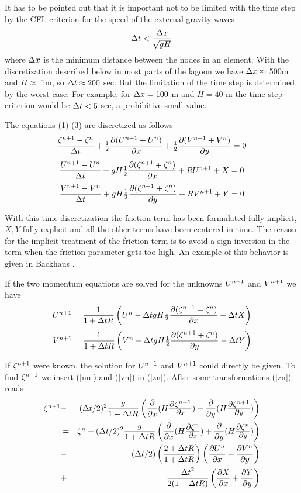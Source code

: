It has to be pointed out that it is important not to be limited with the time
step by the CFL criterion for the speed of the external gravity waves
\[
        \mbox{$\Delta t$} < \frac{\mbox{$\Delta x$}}{\sqrt{gH}}
\]
where $\mbox{$\Delta x$}$ is the minimum distance between the nodes in an element.
With the discretization described below in most parts of the lagoon
we have $\mbox{$\Delta x$} \approx$ 500m and $H \approx$ 1m, so $\mbox{$\Delta t$} \approx 200$ sec.
But the limitation of the time step is determined by the worst case.
For example, for $\mbox{$\Delta x$} = 100$ m and $H = 40$ m
the time step criterion would be $\mbox{$\Delta t$} < 5$ sec, a
prohibitive small value.

The equations (1)-(3) are discretized as follows
\begin{equation}
\label{zn}
\frac{\zn-\zo}{\dt}
                        + \mez \frac{\dpp (\un + \uo)}{\dpp x}
                        + \mez \frac{\dpp (\vn + \vo)}{\dpp y} = 0
\end{equation}
\begin{equation}
\frac{\mbox{$U^{n+1}$}-\mbox{$U^{n}$}}{\mbox{$\Delta t$}} + gH \mbox{$\frac{1}{2}$} \frac{\mbox{$\partial$} (\mbox{$\zeta^{n+1}$} + \mbox{$\zeta^{n}$})}{\mbox{$\partial$} x} + R \mbox{$U^{n+1}$} + X = 0
\end{equation}
\begin{equation}
\frac{\mbox{$V^{n+1}$}-\mbox{$V^{n}$}}{\mbox{$\Delta t$}} + gH \mbox{$\frac{1}{2}$} \frac{\mbox{$\partial$} (\mbox{$\zeta^{n+1}$} + \mbox{$\zeta^{n}$})}{\mbox{$\partial$} y} + R \mbox{$V^{n+1}$} + Y = 0
\end{equation}

With this time discretization the friction term has been formulated
fully implicit, $X,Y$ fully explicit and all the other terms
have been centered in time. The reason for the implicit treatment
of the friction term is to avoid a sign inversion in the term when
the friction parameter gets too high. An example of this behavior is
given in Backhaus \cite{Backhaus83}.

If the two momentum equations are solved for the unknowns $\mbox{$U^{n+1}$}$ and $\mbox{$V^{n+1}$}$
we have
\begin{equation}
\label{un}
\un = \frac{1}{1+\dt R} \paren{ \uo - \dt gH \dzxp - \dt X }
\end{equation}
\begin{equation}
\label{vn}
\vn = \frac{1}{1+\dt R} \paren{ \vo - \dt gH \dzyp - \dt Y }
\end{equation}

If $\mbox{$\zeta^{n+1}$}$ were known, the solution for
$\mbox{$U^{n+1}$}$ and $\mbox{$V^{n+1}$}$ could directly be given. To find $\mbox{$\zeta^{n+1}$}$ we insert
(\ref{un}) and (\ref{vn}) in (\ref{zn}). After some transformations
(\ref{zn}) reads
\begin{eqnarray} \label{zsys}
        \mbox{$\zeta^{n+1}$}
    & - &
        (\mbox{$\Delta t$}/2)^{2} \frac{g}{1+\mbox{$\Delta t$} R}         \nonumber
	\left(  \frac{\mbox{$\partial$}}{\mbox{$\partial$} x}(H \mbox{$\frac{\mbox{$\partial$} \mbox{$\zeta^{n+1}$}}{\mbox{$\partial$} x}$}) + \frac{\mbox{$\partial$}}{\mbox{$\partial$} y}(H \mbox{$\frac{\mbox{$\partial$} \mbox{$\zeta^{n+1}$}}{\mbox{$\partial$} y}$})  \right) \\
    & = &
        \mbox{$\zeta^{n}$} + (\mbox{$\Delta t$}/2)^{2} \frac{g}{1+\mbox{$\Delta t$} R}
	\left(  \frac{\mbox{$\partial$}}{\mbox{$\partial$} x}(H \mbox{$\frac{\mbox{$\partial$} \mbox{$\zeta^{n}$}}{\mbox{$\partial$} x}$}) + \frac{\mbox{$\partial$}}{\mbox{$\partial$} y}(H \mbox{$\frac{\mbox{$\partial$} \mbox{$\zeta^{n}$}}{\mbox{$\partial$} y}$})  \right) \\
    & - & (\mbox{$\Delta t$}/2) \left(  \frac{2+\mbox{$\Delta t$} R}{1+\mbox{$\Delta t$} R}  \right)
        \left(                                \nonumber
          \frac{\mbox{$\partial$} \mbox{$U^{n}$}}{\mbox{$\partial$} x}
        + \frac{\mbox{$\partial$} \mbox{$V^{n}$}}{\mbox{$\partial$} y}
         \right) \\
    & + & \frac{\mbox{$\Delta t$}^{2}}{2(1+\mbox{$\Delta t$} R)}            \nonumber
                \left(  \frac{\mbox{$\partial$} X}{\mbox{$\partial$} x} + \frac{\mbox{$\partial$} Y}{\mbox{$\partial$} y}  \right)
\end{eqnarray}


